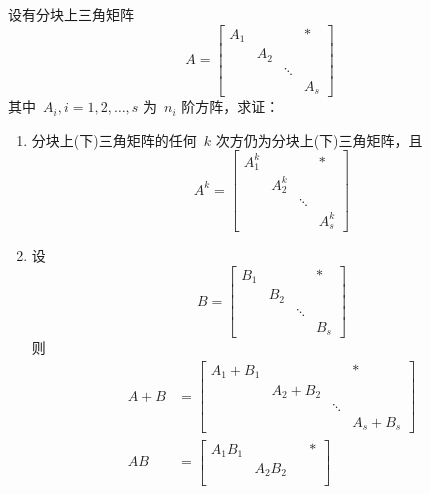 \documentclass[twoside,openright]{book}
\begin{document}
\begin{CJK*}{UTF8}{}
\begin{quest}
\label{quest:44}
设有分块上三角矩阵
\[
A=
\begin{bmatrix}
A_1             &                 &                 & *   \\
                & A_2             &                 &     \\
                &                 & \ddots          &     \\
                &                 &                 & A_s
\end{bmatrix}
\]
其中\ $A_i,i=1,2,\dotsc,s$ 为\ $n_i$ 阶方阵，求证：
\begin{enumerate}
\item
分块上(下)三角矩阵的任何\ $k$ 次方仍为分块上(下)三角矩阵，且
\[
A^k=
\begin{bmatrix}
A_1^k           &                 &                 & *   \\
                & A_2^k           &                 &     \\
                &                 & \ddots          &     \\
                &                 &                 & A_s^k
\end{bmatrix}
\]
\item
设
\[
B=
\begin{bmatrix}
B_1             &                 &                 & *   \\
                & B_2             &                 &     \\
                &                 & \ddots          &     \\
                &                 &                 & B_s
\end{bmatrix}
\]
则
\[
\begin{split}
A+B&=
\begin{bmatrix}
A_1+B_1         &                 &                 & *   \\
                & A_2+B_2         &                 &     \\
                &                 & \ddots          &     \\
                &                 &                 & A_s+B_s
\end{bmatrix}\\
AB&=
\begin{bmatrix}
A_1B_1          &                 &                 & *   \\
                & A_2B_2          &                 &     \\

\end{bmatrix}
\end{split}\]
\end{enumerate}
\end{quest}
\end{CJK*}
\end{document}
